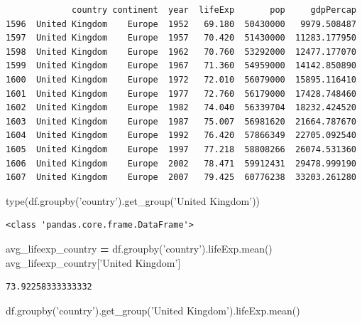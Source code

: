 \documentclass[
  letterpaper,
]{scrbook}
\newenvironment{Shaded}{\begin{snugshade}}{\end{snugshade}}
\newcommand{\BuiltInTok}[1]{#1}
\newcommand{\NormalTok}[1]{#1}
\newcommand{\OperatorTok}[1]{\textcolor[rgb]{0.81,0.36,0.00}{\textbf{#1}}}
\newcommand{\StringTok}[1]{\textcolor[rgb]{0.31,0.60,0.02}{#1}}
\begin{document}
\begin{verbatim}
             country continent  year  lifeExp       pop     gdpPercap
1596  United Kingdom    Europe  1952   69.180  50430000   9979.508487
1597  United Kingdom    Europe  1957   70.420  51430000  11283.177950
1598  United Kingdom    Europe  1962   70.760  53292000  12477.177070
1599  United Kingdom    Europe  1967   71.360  54959000  14142.850890
1600  United Kingdom    Europe  1972   72.010  56079000  15895.116410
1601  United Kingdom    Europe  1977   72.760  56179000  17428.748460
1602  United Kingdom    Europe  1982   74.040  56339704  18232.424520
1603  United Kingdom    Europe  1987   75.007  56981620  21664.787670
1604  United Kingdom    Europe  1992   76.420  57866349  22705.092540
1605  United Kingdom    Europe  1997   77.218  58808266  26074.531360
1606  United Kingdom    Europe  2002   78.471  59912431  29478.999190
1607  United Kingdom    Europe  2007   79.425  60776238  33203.261280
\end{verbatim}

\begin{Shaded}
\begin{Highlighting}[]
\BuiltInTok{type}\NormalTok{(df.groupby(}\StringTok{'country'}\NormalTok{).get_group(}\StringTok{'United Kingdom'}\NormalTok{))}
\end{Highlighting}
\end{Shaded}

\begin{verbatim}
<class 'pandas.core.frame.DataFrame'>
\end{verbatim}

\begin{Shaded}
\begin{Highlighting}[]
\NormalTok{avg_lifeexp_country }\OperatorTok{=}\NormalTok{ df.groupby(}\StringTok{'country'}\NormalTok{).lifeExp.mean()}
\NormalTok{avg_lifeexp_country[}\StringTok{'United Kingdom'}\NormalTok{]}
\end{Highlighting}
\end{Shaded}

\begin{verbatim}
73.92258333333332
\end{verbatim}

\begin{Shaded}
\begin{Highlighting}[]
\NormalTok{df.groupby(}\StringTok{'country'}\NormalTok{).get_group(}\StringTok{'United Kingdom'}\NormalTok{).lifeExp.mean()}
\end{Highlighting}
\end{Shaded}
\end{document}
